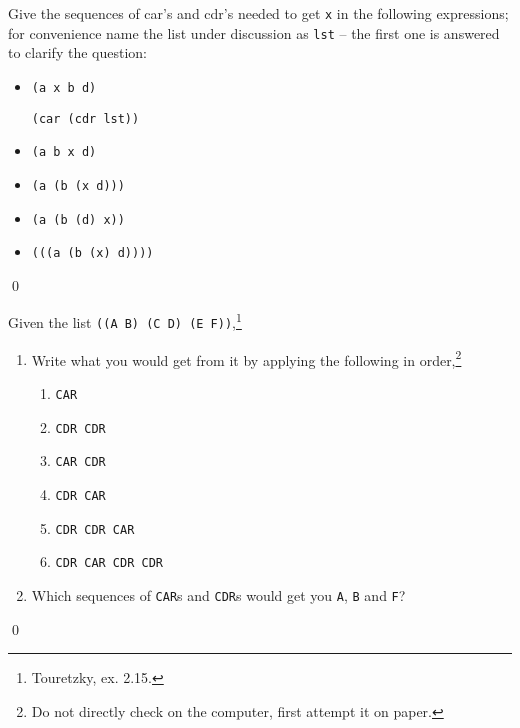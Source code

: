 \documentclass[a4paper,11pt]{article}
\begin{document}
\begin{uexercise}

Give the sequences of car's and cdr's needed to get \Verb+x+ in the following expressions; for convenience name the list under discussion as \Verb+lst+ -- the first one is answered to clarify the question:
\begin{itemize}
\item \Verb+(a x b d)+

 \Verb+(car (cdr lst))+

\item \Verb+(a b x d)+

\item \Verb+(a (b (x d)))+

\item \Verb+(a (b (d) x))+

\item \Verb+(((a (b (x) d))))+

\end{itemize}

\qed
\end{uexercise}

\begin{uexercise}
Given the list \Verb+((A B) (C D) (E F))+,\footnote{Touretzky, ex. 2.15.} 

\begin{enumerate}
\item Write what you would get from it by applying the following in order,\footnote{Do not directly check on the computer, first attempt it on paper.}
	\begin{enumerate}
	\item \Verb+CAR+
	\item \Verb+CDR CDR+
	\item \Verb+CAR CDR +
	\item \Verb+CDR CAR +
	\item \Verb+CDR CDR CAR +
	\item \Verb+CDR CAR CDR CDR +
	\end{enumerate}

\item Which sequences of \Verb+CAR+s and \Verb+CDR+s would get you \Verb+A+, \Verb+B+ and \Verb+F+?
\end{enumerate}

\qed
\end{uexercise}
\end{document}
